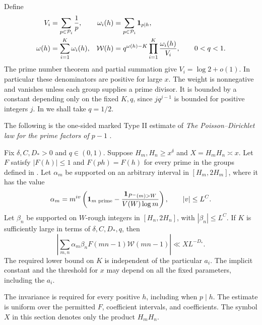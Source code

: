 Define
\begin{equation}\label{eq:marked-weight}
 \begin{aligned}
 V_i&=\sum_{p\in\mathcal P_i}\frac1p,
 &\omega_i(h)&=\sum_{p\in\mathcal P_i}\mathbf{1}_{p\mid h},\\
 \omega(h)&=\sum_{i=1}^K\omega_i(h),
 &\mathcal W(h)&=q^{\omega(h)-K}
                 \prod_{i=1}^K\frac{\omega_i(h)}{V_i},
                 \qquad 0<q<1.
 \end{aligned}
\end{equation}
The prime number theorem and partial summation give
\(V_i=\log 2+o(1)\).  In particular these denominators are positive
for large \(x\).  The weight is nonnegative and vanishes unless each
group supplies a prime divisor.  It is bounded by a constant depending
only on the fixed \(K,q\), since \(j q^{j-1}\) is bounded for positive
integers \(j\).  In  we shall take \(q=1/2\).

The following is the one-sided marked Type II estimate of
\emph{The Poisson--Dirichlet law for the prime factors of \(p-1\)}
\cite[Theorem~3.1]{PoissonDirichlet}.
\begin{theorem}\label{thm:marked-type-ii}
Fix \(\delta,C,D_*>0\) and \(q\in(0,1)\).  Suppose
\(H_m,H_n\ge x^\delta\) and \(X=H_mH_n\asymp x\).  Let \(F\) satisfy
\(|F(h)|\le1\) and \(F(ph)=F(h)\) for every prime in the groups
defined in .  Let \(\alpha_m\) be supported on an
arbitrary interval in \([H_m,2H_m]\), where it has the value
\[
 \alpha_m=m^{iv}\left(\mathbf{1}_{m\text{ prime}}
       -\frac{\mathbf{1}_{P^-(m)>W}}{V(W)\log m}\right),
 \qquad |v|\le L^C.
\]
Let \(\beta_n\) be supported on \(W\)-rough integers in \([H_n,2H_n]\),
with \(|\beta_n|\le L^C\).  If \(K\) is sufficiently large in terms of
\(\delta,C,D_*,q\), then
\begin{equation}\label{eq:marked-type-ii}
 \left|\sum_{m,n}\alpha_m\beta_n F(mn-1)\mathcal W(mn-1)\right|
       \ll X L^{-D_*}.
\end{equation}
The required lower bound on \(K\) is independent of the particular
\(a_i\).  The implicit constant and the threshold for \(x\) may depend
on all the fixed parameters, including the \(a_i\).
\end{theorem}

The invariance is required for every positive \(h\), including when
\(p\mid h\).  The estimate is uniform over the permitted \(F\),
coefficient intervals, and coefficients.  The symbol \(X\) in this
section denotes only the product \(H_mH_n\).

